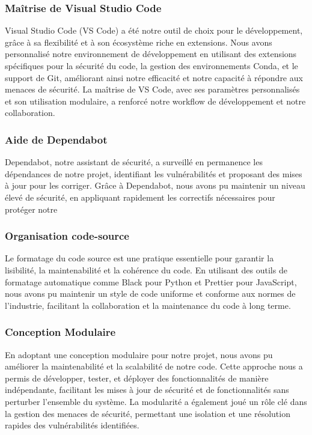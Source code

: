 \subsubsection{Maîtrise de Visual Studio Code}

Visual Studio Code (VS Code) a été notre outil de choix pour le développement, grâce à sa flexibilité et à son écosystème riche en extensions. Nous avons personnalisé notre environnement de développement en utilisant des extensions spécifiques pour la sécurité du code, la gestion des environnements Conda, et le support de Git, améliorant ainsi notre efficacité et notre capacité à répondre aux menaces de sécurité. La maîtrise de VS Code, avec ses paramètres personnalisés et son utilisation modulaire, a renforcé notre workflow de développement et notre collaboration.

\subsubsection{Aide de Dependabot}

Dependabot, notre assistant de sécurité, a surveillé en permanence les dépendances de notre projet, identifiant les vulnérabilités et proposant des mises à jour pour les corriger. Grâce à Dependabot, nous avons pu maintenir un niveau élevé de sécurité, en appliquant rapidement les correctifs nécessaires pour protéger notre

\subsubsection{Organisation code-source}

Le formatage du code source est une pratique essentielle pour garantir la lisibilité, la maintenabilité et la cohérence du code. En utilisant des outils de formatage automatique comme Black pour Python et Prettier pour JavaScript, nous avons pu maintenir un style de code uniforme et conforme aux normes de l'industrie, facilitant la collaboration et la maintenance du code à long terme.

\subsubsection{Conception Modulaire}

En adoptant une conception modulaire pour notre projet, nous avons pu améliorer la maintenabilité et la scalabilité de notre code. Cette approche nous a permis de développer, tester, et déployer des fonctionnalités de manière indépendante, facilitant les mises à jour de sécurité et de fonctionnalités sans perturber l'ensemble du système. La modularité a également joué un rôle clé dans la gestion des menaces de sécurité, permettant une isolation et une résolution rapides des vulnérabilités identifiées.


